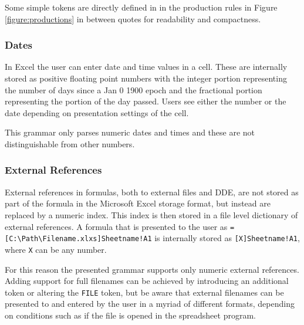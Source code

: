 \documentclass[conference]{IEEEtran}
\begin{document}
Some simple tokens are directly defined in  in the production rules in Figure \ref{figure:productions} in between quotes for readability and compactness.

\subsubsection{\textbf{Dates}}

In Excel the user can enter date and time values in a cell.
These are internally stored as positive floating point numbers with the integer portion representing the number of days since a Jan 0 1900 epoch and the fractional portion representing the portion of the day passed.
Users see either the number or the date depending on presentation settings of the cell.

This grammar only parses numeric dates and times and these are not distinguishable from other numbers.

\subsubsection{\textbf{External References}}

External references in formulas, both to external files and DDE, are not stored as part of the formula in the Microsoft Excel storage format, but instead are replaced by a numeric index.
This index is then stored in a file level dictionary of external references.
A formula that is presented to the user as \texttt{=[C:\textbackslash Path\textbackslash Filename.xlxs]Sheetname!A1} is internally stored as \texttt{[X]Sheetname!A1}, where \texttt{X} can be any number.

For this reason the presented grammar supports only numeric external references.
Adding support for full filenames can be achieved by introducing an additional token or altering the \texttt{FILE} token, but be aware that external filenames can be presented to and entered by the user in a myriad of different formats, depending on conditions such as if the file is opened in the spreadsheet program.
\end{document}
